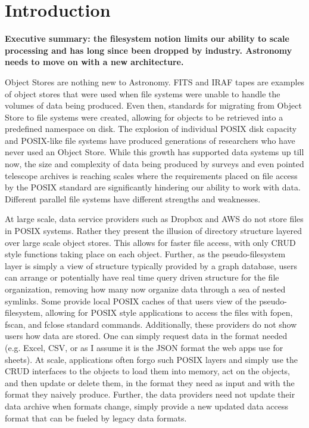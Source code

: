 
\section{Introduction} \label{sec:intro}

\textbf{Executive summary: the filesystem notion limits our ability to scale processing and has long since been dropped by industry. Astronomy needs to move on with a new architecture.}

Object Stores are nothing new to Astronomy.  \gls{FITS} and \gls{IRAF} tapes are examples
of object stores that were used when file systems were unable to handle the volumes
of data being produced. Even then, standards for migrating from Object Store to file
systems were created, allowing for objects to be retrieved into a predefined namespace
on disk.  The explosion of individual \gls{POSIX} disk capacity and \gls{POSIX}-like file systems
have produced generations of researchers who have never used an Object Store. While
this growth has supported data systems up till now, the size and complexity of
data being produced by surveys and even pointed telescope archives is reaching
scales where the requirements placed on file access by the \gls{POSIX} standard are
significantly hindering our ability to work with data.  Different parallel file systems
have different strengths and weaknesses.

At large scale, data service providers such as Dropbox and \gls{AWS} do not store files
in \gls{POSIX} systems.  Rather they present the illusion of directory structure layered over
large scale object stores. This allows for faster file access, with only \gls{CRUD} style
functions taking place on each object.  Further, as the pseudo-filesystem layer is simply a
view of structure typically provided by a graph database, users can arrange or potentially
have real time query driven structure for the file organization, removing how many now
organize data through a sea of nested symlinks.
Some provide local \gls{POSIX} caches of that users view of the
pseudo-filesystem, allowing for \gls{POSIX} style applications to access the files with
fopen, fscan, and fclose standard commands. Additionally, these providers do
not show users how data are stored. One can simply request data in the format
needed (e.g. Excel, \gls{CSV}, or as I assume it is the \gls{JSON} format the web apps
use for sheets).   At scale, applications often forgo
such POSIX layers and simply use the \gls{CRUD} interfaces to the objects to load them into
memory, act on the objects, and then update or delete them, in the format they need
as input and with the format they naively produce. Further, the data providers need
not update their data archive when formats change, simply provide a new updated
data access format that can be fueled by legacy data formats.

